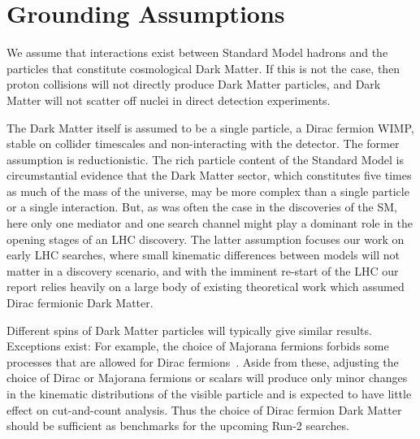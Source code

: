 \section{Grounding Assumptions}

We assume that interactions exist between Standard Model hadrons
and the particles that constitute cosmological Dark Matter. If this
is not the case, then proton collisions will not directly produce Dark Matter
particles, and Dark Matter will not scatter off nuclei in direct
detection experiments.

The Dark Matter itself is assumed to be a single particle, a Dirac
fermion WIMP, stable on collider timescales and non-interacting with
the detector.  
The former assumption is reductionistic.
The rich particle content of the Standard Model is circumstantial evidence that
the Dark Matter sector, which constitutes five times as much of the
mass of the universe, may be more complex than a single particle or a
single interaction. But, as was often the case in the discoveries of
the SM, here only one mediator and one search channel might play a
dominant role in the opening stages of an LHC discovery. The latter
assumption focuses our work on early LHC searches, where small
kinematic differences between models will not matter in a discovery
scenario, and with the imminent re-start of the LHC our report relies
heavily on a large body of existing theoretical work which assumed Dirac fermionic Dark Matter. 

Different spins of Dark Matter particles will typically
give similar results. Exceptions exist: For example, the choice of Majorana fermions forbids some
processes that are allowed for Dirac fermions~\cite{Goodman:2010yf}.
Aside from these, adjusting the choice of Dirac or Majorana fermions or scalars will produce only minor changes
in the kinematic distributions of the visible particle and is expected to have little effect
on cut-and-count analysis. Thus the choice of Dirac
fermion Dark Matter should be sufficient as benchmarks for the upcoming Run-2 searches. 


